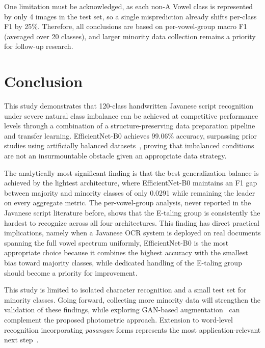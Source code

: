\documentclass[conference]{IEEEtran}
\begin{document}
One limitation must be acknowledged, as each non-A Vowel class is
represented by only 4 images in the test set, so a single misprediction
already shifts per-class F1 by 25\%.
Therefore, all conclusions are based on per-vowel-group macro F1
(averaged over 20 classes), and larger minority data collection
remains a priority for follow-up research.

\section{Conclusion}
\label{sec:conclusion}

This study demonstrates that 120-class handwritten Javanese script
recognition under severe natural class imbalance can be achieved at
competitive performance levels through a combination of a
structure-preserving data preparation pipeline and transfer learning.
EfficientNet-B0 achieves 99.06\% accuracy, surpassing prior studies
using artificially balanced datasets~\cite{susantoIJECE2023}, proving
that imbalanced conditions are not an insurmountable obstacle given
an appropriate data strategy.

The analytically most significant finding is that the best
generalization balance is achieved by the lightest architecture, where
EfficientNet-B0 maintains an F1 gap between majority and minority
classes of only 0.0291 while remaining the leader on every aggregate
metric.
The per-vowel-group analysis, never reported in the Javanese script
literature before, shows that the E-taling group is consistently the
hardest to recognize across all four architectures.
This finding has direct practical implications, namely when a Javanese
OCR system is deployed on real documents spanning the full vowel
spectrum uniformly, EfficientNet-B0 is the most appropriate choice
because it combines the highest accuracy with the smallest bias toward
majority classes, while dedicated handling of the E-taling group should
become a priority for improvement.

This study is limited to isolated character recognition and a small
test set for minority classes.
Going forward, collecting more minority data will strengthen the
validation of these findings, while exploring GAN-based
augmentation~\cite{faizin2025} can complement the proposed photometric
approach.
Extension to word-level recognition incorporating \textit{pasangan}
forms represents the most application-relevant next
step~\cite{wicaksono2024}.
\end{document}
